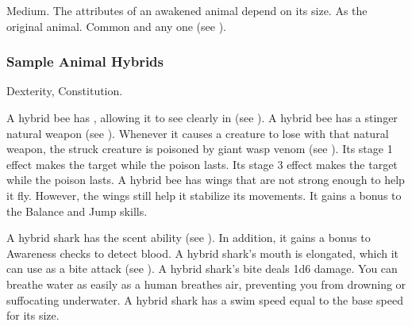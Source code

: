          Medium.
         The attributes of an awakened animal depend on its size.
         As the original animal.
         Common and any one  (see ).

        \subsubsection{Sample Animal Hybrids}


              Dexterity,  Constitution.
            \begin{itemize}
                 A hybrid bee has , allowing it to see clearly in  (see ).
                 A hybrid bee has a stinger natural weapon (see ).
                    Whenever it causes a creature to lose  with that natural weapon, the struck creature is poisoned by giant wasp venom (see ).
                    Its stage 1 effect makes the target \slowed while the poison lasts.
                    Its stage 3 effect makes the target \immobilized while the poison lasts.
                 A hybrid bee has wings that are not strong enough to help it fly.
                    However, the wings still help it stabilize its movements.
                    It gains a  bonus to the Balance and Jump skills.
            \end{itemize}


            \begin{itemize}
                 A hybrid shark has the scent ability (see ).
                    In addition, it gains a  bonus to Awareness checks to detect blood.
                 A hybrid shark's mouth is elongated, which it can use as a bite attack (see ).
                    A hybrid shark's bite deals 1d6 damage.
                 You can breathe water as easily as a human breathes air, preventing you from drowning or suffocating underwater.
                 A hybrid shark has a swim speed equal to the base speed for its size.
            \end{itemize}

